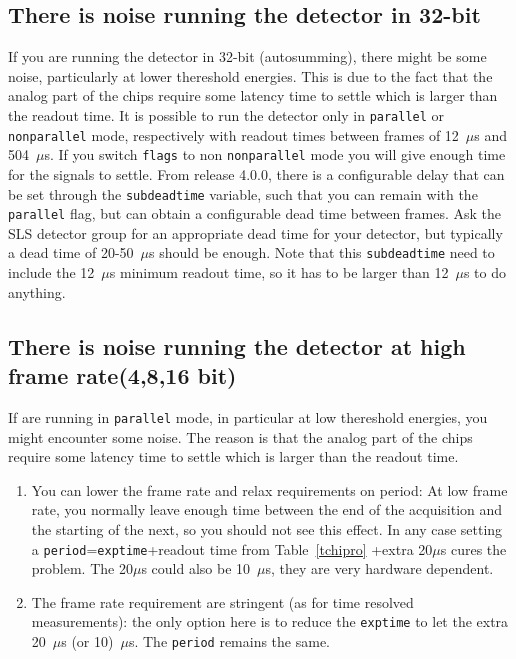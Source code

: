 \documentclass{article}
\begin{document}
\subsection{There is noise running the detector in 32-bit}
If you are running the detector in 32-bit (autosumming), there might be some noise, particularly at lower thereshold energies. This is due to the fact that the analog part of the chips require some latency time to settle which is larger than the readout time. It is possible to run the detector only in {\tt{parallel}} or {\tt{nonparallel}} mode, respectively with readout times between frames of 12~$\mu$s and 504~$\mu$s. If you switch {\tt{flags}} to non {\tt{nonparallel}} mode you will give enough time for the signals to settle. From release 4.0.0, there is a configurable delay that can be set through the {\tt{subdeadtime}} variable, such that you can remain with the {\tt{parallel}} flag, but can obtain a configurable dead time between frames. Ask the SLS detector group for an appropriate dead time for your detector, but typically a dead time of 20-50~$\mu$s should be enough. Note that this {\tt{subdeadtime}} need to include the 12~$\mu$s minimum readout time, so it has to be larger than 12~$\mu$s to do anything.  
 
\subsection{There is noise running the detector at high frame rate(4,8,16 bit)}
If are running in {\tt{parallel}} mode, in particular at low thereshold energies, you might encounter some noise. The reason is that the analog part of the chips require some latency time to settle which is larger than the readout time. 
\begin{enumerate}
\item You can lower the frame rate and relax requirements on period: 
At low frame rate, you normally leave enough time between the end of the acquisition and the starting of the next, so you should not see this effect. In any case setting a {\tt{period}}={\tt{exptime}}+readout time from Table~\ref{tchipro} +extra 20$\mu$s cures the problem. The 20$\mu$s could also be 10~$\mu$s, they are very hardware dependent.
\item The frame rate requirement are stringent (as for time resolved measurements): the only option here is to reduce the {\tt{exptime}} to let the extra 20~$\mu$s (or 10)~$\mu$s. The {\tt{period}} remains the same.
\end{enumerate} 
 
\end{document}
